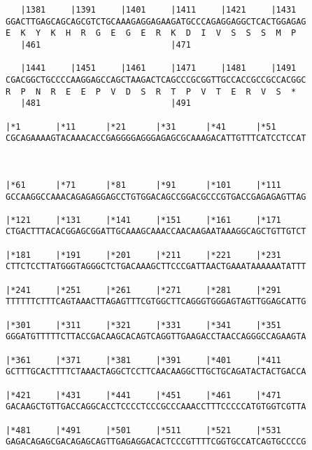 \documentclass{article}
\begin{document}
\begin{Verbatim}
   |1381     |1391     |1401     |1411     |1421     |1431  
GGACTTGAGCAGCAGCGTCTGCAAAGAGGAGAAGATGCCCAGAGGAGGCTCACTGGAGAG
E  K  Y  K  H  R  G  E  G  E  R  K  D  I  V  S  S  S  M  P  
   |461                          |471                       
  
   |1441     |1451     |1461     |1471     |1481     |1491  
CGACGGCTGCCCCAAGGAGCCAGCTAAGACTCAGCCCGCGGTTGCCACCGCCGCCACGGC
R  P  N  R  E  E  P  V  D  S  R  T  P  V  T  E  R  V  S  *  
   |481                          |491                       
  
|*1       |*11      |*21      |*31      |*41      |*51      
CGCAGAAAAGTACAAACACCGAGGGGAGGGAGAGCGCAAAGACATTGTTTCATCCTCCAT
 
                                                            
  
|*61      |*71      |*81      |*91      |*101     |*111     
GCCAAGGCCAAACAGAGAGGAGCCTGTGGACAGCCGGACGCCCGTGACCGAGAGAGTTAG
                                                            
|*121     |*131     |*141     |*151     |*161     |*171     
CTGACTTTACACGGAGCGGATTGCAAAGCAAACCAACAAGAATAAAGGCAGCTGTTGTCT
                                                            
|*181     |*191     |*201     |*211     |*221     |*231     
CTTCTCCTTATGGGTAGGGCTCTGACAAAGCTTCCCGATTAACTGAAATAAAAAATATTT
                                                            
|*241     |*251     |*261     |*271     |*281     |*291     
TTTTTTCTTTCAGTAAACTTAGAGTTTCGTGGCTTCAGGGTGGGAGTAGTTGGAGCATTG
                                                            
|*301     |*311     |*321     |*331     |*341     |*351     
GGGATGTTTTTCTTACCGACAAGCACAGTCAGGTTGAAGACCTAACCAGGGCCAGAAGTA
                                                            
|*361     |*371     |*381     |*391     |*401     |*411     
GCTTTGCACTTTTCTAAACTAGGCTCCTTCAACAAGGCTTGCTGCAGATACTACTGACCA
                                                            
|*421     |*431     |*441     |*451     |*461     |*471     
GACAAGCTGTTGACCAGGCACCTCCCCTCCCGCCCAAACCTTTCCCCCATGTGGTCGTTA
                                                            
|*481     |*491     |*501     |*511     |*521     |*531     
GAGACAGAGCGACAGAGCAGTTGAGAGGACACTCCCGTTTTCGGTGCCATCAGTGCCCCG
                                                            

\end{Verbatim}
\end{document}
